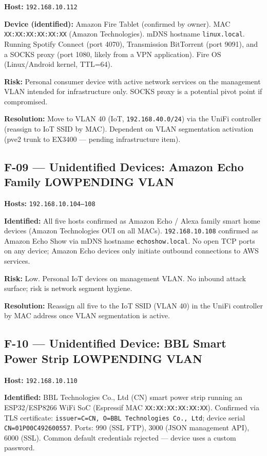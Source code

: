 \documentclass[11pt,a4paper]{article}
\newcommand{\low}{\colorbox{low}{\color{white}\small\textbf{LOW}}}
\newcommand{\pendingvlan}{\colorbox{pending}{\color{white}\small\textbf{PENDING VLAN}}}
\begin{document}
\textbf{Host:} \texttt{192.168.10.112}

\textbf{Device (identified):} Amazon Fire Tablet (confirmed by owner). MAC
\texttt{XX:XX:XX:XX:XX:XX} (Amazon Technologies). mDNS hostname \texttt{linux.local}.
Running Spotify Connect (port 4070), Transmission BitTorrent (port 9091), and a SOCKS
proxy (port 1080, likely from a VPN application). Fire OS (Linux/Android kernel, TTL=64).

\textbf{Risk:} Personal consumer device with active network services on the management VLAN
intended for infrastructure only. SOCKS proxy is a potential pivot point if compromised.

\textbf{Resolution:} Move to VLAN 40 (IoT, \texttt{192.168.40.0/24}) via the UniFi
controller (reassign to IoT SSID by MAC). Dependent on VLAN segmentation activation
(pve2 trunk to EX3400 — pending infrastructure item).

\subsection{F-09 --- Unidentified Devices: Amazon Echo Family \quad \low \quad \pendingvlan}

\textbf{Hosts:} \texttt{192.168.10.104--108}

\textbf{Identified:} All five hosts confirmed as Amazon Echo / Alexa family smart home
devices (Amazon Technologies OUI on all MACs). \texttt{192.168.10.108} confirmed as Amazon
Echo Show via mDNS hostname \texttt{echoshow.local}. No open TCP ports on any device;
Amazon Echo devices only initiate outbound connections to AWS services.

\textbf{Risk:} Low. Personal IoT devices on management VLAN. No inbound attack surface;
risk is network segment hygiene.

\textbf{Resolution:} Reassign all five to the IoT SSID (VLAN 40) in the UniFi controller
by MAC address once VLAN segmentation is active.

\subsection{F-10 --- Unidentified Device: BBL Smart Power Strip \quad \low \quad \pendingvlan}

\textbf{Host:} \texttt{192.168.10.110}

\textbf{Identified:} BBL Technologies Co., Ltd (CN) smart power strip running an ESP32/ESP8266
WiFi SoC (Espressif MAC \texttt{XX:XX:XX:XX:XX:XX}). Confirmed via TLS certificate:
\texttt{issuer=C=CN, O=BBL Technologies Co., Ltd}; device serial
\texttt{CN=01P00C492600557}. Ports: 990 (SSL FTP), 3000 (JSON management API), 6000 (SSL).
Common default credentials rejected — device uses a custom password.
\end{document}

